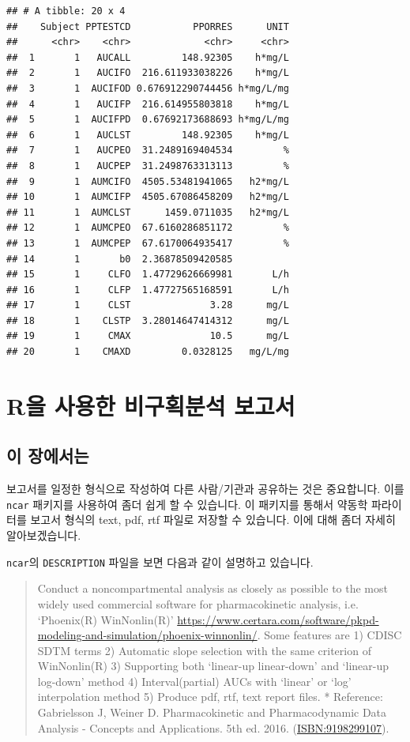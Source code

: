 \documentclass[12pt,]{krantz}
\theoremstyle{definition}
\theoremstyle{definition}
\theoremstyle{definition}
\theoremstyle{remark}
\begin{document}
\begin{verbatim}
## # A tibble: 20 x 4
##    Subject PPTESTCD           PPORRES      UNIT
##      <chr>    <chr>             <chr>     <chr>
##  1       1   AUCALL         148.92305    h*mg/L
##  2       1   AUCIFO  216.611933038226    h*mg/L
##  3       1  AUCIFOD 0.676912290744456 h*mg/L/mg
##  4       1   AUCIFP  216.614955803818    h*mg/L
##  5       1  AUCIFPD  0.67692173688693 h*mg/L/mg
##  6       1   AUCLST         148.92305    h*mg/L
##  7       1   AUCPEO  31.2489169404534         %
##  8       1   AUCPEP  31.2498763313113         %
##  9       1  AUMCIFO  4505.53481941065   h2*mg/L
## 10       1  AUMCIFP  4505.67086458209   h2*mg/L
## 11       1  AUMCLST      1459.0711035   h2*mg/L
## 12       1  AUMCPEO  67.6160286851172         %
## 13       1  AUMCPEP  67.6170064935417         %
## 14       1       b0  2.36878509420585          
## 15       1     CLFO  1.47729626669981       L/h
## 16       1     CLFP  1.47727565168591       L/h
## 17       1     CLST              3.28      mg/L
## 18       1    CLSTP  3.28014647414312      mg/L
## 19       1     CMAX              10.5      mg/L
## 20       1    CMAXD         0.0328125   mg/L/mg
\end{verbatim}

\chapter{R을 사용한 비구획분석 보고서}\label{ncar}

\section{이 장에서는}\label{summary-ncar}

보고서를 일정한 형식으로 작성하여 다른 사람/기관과 공유하는 것은
중요합니다. 이를 \texttt{ncar} 패키지를 사용하여 좀더 쉽게 할 수
있습니다. 이 패키지를 통해서 약동학 파라이터를 보고서 형식의 text, pdf,
rtf 파일로 저장할 수 있습니다. 이에 대해 좀더 자세히 알아보겠습니다.

\texttt{ncar}의 \texttt{DESCRIPTION} 파일을 보면 다음과 같이 설명하고
있습니다.

\begin{quote}
Conduct a noncompartmental analysis as closely as possible to the most
widely used commercial software for pharmacokinetic analysis, i.e.
`Phoenix(R) WinNonlin(R)'
\url{https://www.certara.com/software/pkpd-modeling-and-simulation/phoenix-winnonlin/}.
Some features are 1) CDISC SDTM terms 2) Automatic slope selection with
the same criterion of WinNonlin(R) 3) Supporting both `linear-up
linear-down' and `linear-up log-down' method 4) Interval(partial) AUCs
with `linear' or `log' interpolation method 5) Produce pdf, rtf, text
report files. * Reference: Gabrielsson J, Weiner D. Pharmacokinetic and
Pharmacodynamic Data Analysis - Concepts and Applications. 5th ed. 2016.
(\url{ISBN:9198299107}).
\end{quote}
\end{document}
